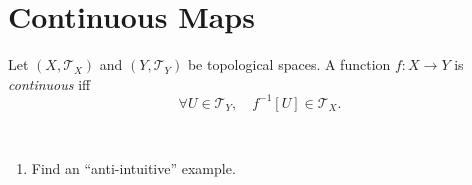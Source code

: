 \section{Continuous Maps}


\begin{definition}
	Let $(X, \mathcal T_X)$ and $(Y, \mathcal T_Y)$ be topological spaces. A function $f: X \to Y$ is \textit{continuous} iff
	$$
	\forall U \in \mathcal T_Y, \quad f^{-1}[U] \in \mathcal T_X.
	$$
\end{definition}


\begin{note} \
	\begin{enumerate}
		\item Find an ``anti-intuitive'' example.
	\end{enumerate}
\end{note}































%